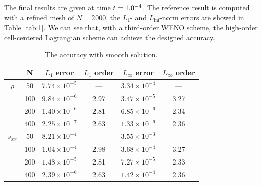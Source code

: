 \documentclass{article}
\numberwithin{equation}{section}
\numberwithin{table}{section}
\begin{document}
The final results are given at time $t = 1.0 \time 10^{-4}$. The reference  result is computed with a refined mesh of $N = 2000$, the  $L_1 $- and $ L_\inf$-norm  errors  are showed in Table \ref{tab:1}. We can see that,  with a third-order WENO scheme, the high-order cell-centered Lagrangian scheme can  achieve the designed  accuracy.     

\begin{table}[htbp]
  \small
  \centering
\setlength{\belowcaptionskip}{10pt}
\caption{\small The accuracy with smooth solution.}
  \begin{tabular}{cccccc}
	\toprule
	        & N       & $L_1$ error  & $L_1$ order & $L_{\infty}$ error & $L_{\infty}$ order \\
	\midrule
	$ \rho $      &50           &  $7.74\times 10^{-5}$     &---         &  $3.34\times 10^{-4}$         & ---  \\
			      &100          &  $9.84\times 10^{-6}$     &2.97        &  $3.47\times 10^{-5}$         & 3.27 \\
	              &200          &  $1.40\times 10^{-6}$     &2.81        &  $6.85\times 10^{-6}$		 & 2.34 \\
				  &400          &  $2.25\times 10^{-7}$     &2.63        &  $1.33\times 10^{-6}$         & 2.36 \\
	$s_{xx}$     &50           &  $8.21\times 10^{-4}$     &---         &  $3.55\times 10^{-3}$         & ---  \\
				  &100          &  $1.04\times 10^{-4}$     &2.98        &  $3.68\times 10^{-4}$         & 3.27 \\
				  &200          &  $1.48\times 10^{-5}$     &2.81        &  $7.27\times 10^{-5}$         & 2.33 \\
				  &400          &  $2.39\times 10^{-6}$     &2.63        &  $1.42\times 10^{-4}$         & 2.36 \\
	\bottomrule
	\end{tabular}
\label{table1}
\end{table}
\end{document}

